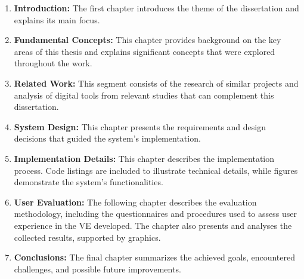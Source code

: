 \begin{enumerate}
\item \textbf{Introduction:} The first chapter introduces the theme of the dissertation and explains its main focus.

\item \textbf{Fundamental Concepts:} This chapter provides background on the key areas of this thesis and explains significant concepts that were explored throughout the work.

\item \textbf{Related Work:} This segment consists of the research of similar projects and analysis of digital tools from relevant studies that can complement this dissertation.

\item \textbf{System Design:} This chapter presents the requirements and design decisions that guided the system's implementation.

\item \textbf{Implementation Details:} This chapter describes the implementation process. Code listings are included to illustrate technical details, while figures demonstrate the system’s functionalities.

\item \textbf{User Evaluation:} The following chapter describes the evaluation methodology, including the questionnaires and procedures used to assess user experience in the \gls{VE} developed. The chapter also presents and analyses the collected results, supported by graphics.

\item \textbf{Conclusions:} The final chapter summarizes the achieved goals,  encountered challenges, and possible future improvements. 
\end{enumerate}